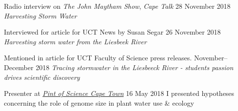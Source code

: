\documentclass[10pt]{article}
\begin{document}
\begin{hangparas}{2em}{1}


Radio interview on \textit{The John Maytham Show}, \textit{Cape Talk}
                                                  \hfill 28 November 2018 \break
\textit{Harvesting Storm Water}

Interviewed for article for UCT News by Susan Segar
                                                  \hfill 26 November 2018 \break
\textit{Harvesting storm water from the Liesbeek River}

Mentioned in article for UCT Faculty of Science press releases.
                                           \hfill November--December 2018 \break
\textit{Tracing stormwater in the Liesbeeck River - students passion drives
scientific discovery}

Presenter at \href{http://pintofsciencesa.wixsite.com/pintofsciencesa/uct-planet-earth-16}
{\textit{Pint of Science Cape Town}}                   \hfill 16 May 2018 \break
I presented hypotheses concerning the role of genome size in plant water use 
\& ecology

\hfill

\end{hangparas}
\end{document}
